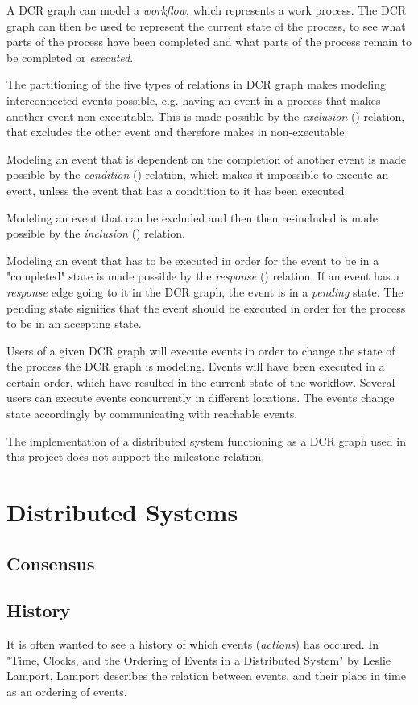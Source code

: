 	A DCR graph can model a \textit{workflow}, which represents a work process. The DCR graph can then be used to represent the current state of the process, to see what parts of the process have been completed and what parts of the process remain to be completed or \textit{executed}. 
	
	The partitioning of the five types of relations in DCR graph makes modeling interconnected events possible, e.g. having an event in a process that makes another event non-executable. This is made possible by the \textit{exclusion} (\exclusion) relation, that excludes the other event and therefore makes in non-executable. 
	
	Modeling an event that is dependent on the completion of another event is made possible by the \textit{condition} (\condition) relation, which makes it impossible to execute an event, unless the event that has a condtition to it has been executed.
	
	Modeling an event that can be excluded and then then re-included is made possible by the \textit{inclusion} (\inclusion) relation. 
	
	Modeling an event that has to be executed in order for the event to be in a "completed" state  is made possible by the \textit{response} (\response) relation. If an event has a \textit{response} edge going to it in the DCR graph, the event is in a \textit{pending} state. The pending state signifies that the event should be executed in order for the process to be in an accepting state.
	
	Users of a given DCR graph will execute events in order to change the state of the process the DCR graph is modeling. Events will have been executed in a certain order, which have resulted in the current state of the workflow. Several users can execute events concurrently in different locations. The events change state accordingly by communicating with reachable events. 
	
	The implementation of a distributed system functioning as a DCR graph used in this project does not support the milestone relation. 
	\section{Distributed Systems}
		\subsection{Consensus}
		\subsection{History}
		It is often wanted to see a history of which events (\textit{actions}) has occured. In "Time, Clocks, and the Ordering of Events in a Distributed System" by Leslie Lamport, Lamport describes the relation between events, and their place in time as an ordering of events. 
		
